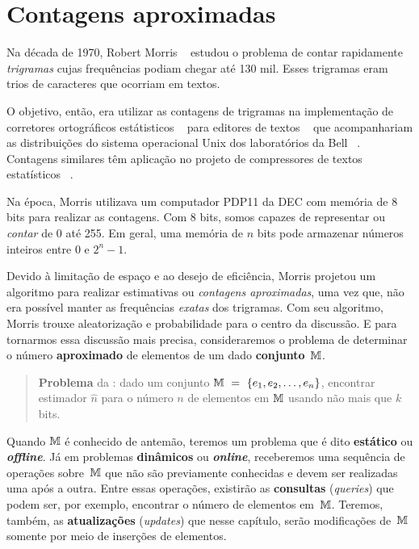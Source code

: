 \chapter{Contagens aproximadas}
\label{chap:morris}


Na década de 1970, Robert Morris ~\citep{morris:78} estudou o problema de contar rapidamente \textit{trigramas} cujas 
frequências podiam chegar até 130 mil. Esses trigramas eram trios de caracteres que ocorriam em textos.

O objetivo, então, era utilizar as contagens de trigramas na implementação de corretores ortográficos estátisticos 
~\citep{morris:lorinda:75} para editores de textos ~\citep{mcmahon:cherry:morris:78} que acompanhariam as distribuições 
do sistema operacional Unix dos laboratórios da Bell ~\citep{lumbroso:2018}. Contagens similares têm aplicação no 
projeto de compressores de textos estatísticos ~\citep{text:compression:1990}.

Na época, Morris utilizava um computador PDP11 da DEC com memória de 8 bits para realizar as contagens. Com 8 bits, 
somos capazes de representar ou \textit{contar} de 0 até 255. Em geral, uma memória de $n$ bits pode armazenar números 
inteiros entre 0 e $2^{n} - 1$.

Devido à limitação de espaço e ao desejo de eficiência, Morris projetou um algoritmo para realizar estimativas ou 
\textit{contagens aproximadas}, uma vez que, não era possível manter as frequências \textit{exatas} dos trigramas. Com 
seu algoritmo, Morris trouxe aleatorização e probabilidade para o centro da discussão. E para tornarmos essa discussão 
mais precisa, consideraremos o problema de determinar o número \textbf{aproximado} de elementos de um dado 
\textbf{conjunto}~$\mathbb{M}$. 

\begin{quote}
  \textbf{Problema} da : dado um conjunto $\mathbb{M}~=~\{ e_1, e_2, \dots, e_n \}$, 
  encontrar estimador $\hat{n}$ para o número $n$ de elementos em $\mathbb{M}$ usando não mais que $k$ bits.
\end{quote}

Quando $\mathbb{M}$ é conhecido de antemão, teremos um problema que é dito \textbf{estático} ou \textit{\textbf{offline}}. 
Já em problemas \textbf{dinâmicos} ou \textit{\textbf{online}}, receberemos uma sequência de operações sobre~$\mathbb{M}$ que 
não são previamente conhecidas e devem ser realizadas uma após a outra. Entre essas operações, existirão as 
\textbf{consultas} (\textit{queries}) que podem ser, por exemplo, encontrar o número de elementos em~$\mathbb{M}$. Teremos, 
também, as \textbf{atualizações} (\textit{updates}) que nesse capítulo, serão modificações de~$\mathbb{M}$ somente por meio de 
inserções de elementos.

